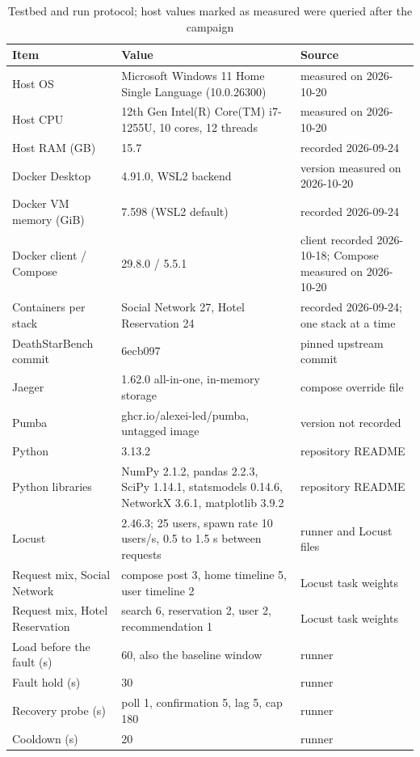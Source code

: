 \begin{table}[!t]
\centering
\caption{Testbed and run protocol; host values marked as measured were queried after the campaign}
\label{tab:tbl_ieee_testbed}
\footnotesize
\setlength{\tabcolsep}{3pt}

\begin{tabular}{p{3.3cm}p{9.6cm}p{4.6cm}}
\toprule
\textbf{Item} & \textbf{Value} & \textbf{Source} \\
\midrule
Host OS & Microsoft Windows 11 Home Single Language (10.0.26300) & measured on 2026-10-20 \\
Host CPU & 12th Gen Intel(R) Core(TM) i7-1255U, 10 cores, 12 threads & measured on 2026-10-20 \\
Host RAM (GB) & 15.7 & recorded 2026-09-24 \\
Docker Desktop & 4.91.0, WSL2 backend & version measured on 2026-10-20 \\
Docker VM memory (GiB) & 7.598 (WSL2 default) & recorded 2026-09-24 \\
Docker client / Compose & 29.8.0 / 5.5.1 & client recorded 2026-10-18; Compose measured on 2026-10-20 \\
Containers per stack & Social Network 27, Hotel Reservation 24 & recorded 2026-09-24; one stack at a time \\
DeathStarBench commit & 6ecb097 & pinned upstream commit \\
Jaeger & 1.62.0 all-in-one, in-memory storage & compose override file \\
Pumba & ghcr.io/alexei-led/pumba, untagged image & version not recorded \\
Python & 3.13.2 & repository README \\
Python libraries & NumPy 2.1.2, pandas 2.2.3, SciPy 1.14.1, statsmodels 0.14.6, NetworkX 3.6.1, matplotlib 3.9.2 & repository README \\
Locust & 2.46.3; 25 users, spawn rate 10 users/s, 0.5 to 1.5 s between requests & runner and Locust files \\
Request mix, Social Network & compose post 3, home timeline 5, user timeline 2 & Locust task weights \\
Request mix, Hotel Reservation & search 6, reservation 2, user 2, recommendation 1 & Locust task weights \\
Load before the fault (s) & 60, also the baseline window & runner \\
Fault hold (s) & 30 & runner \\
Recovery probe (s) & poll 1, confirmation 5, lag 5, cap 180 & runner \\
Cooldown (s) & 20 & runner \\
\bottomrule
\end{tabular}
\end{table}
